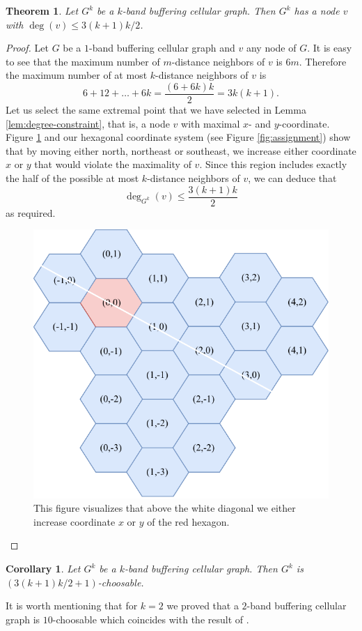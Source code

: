 \documentclass[a4paper, 12pt]{article}
\newtheorem{theo}[lem]{Theorem}
\newtheorem{corollary}[lem]{Corollary}
\begin{document}
\begin{theo}\label{theo:extremal-degree} Let $G^k$ be a $k$-band buffering cellular graph. Then $G^k$ has a node $v$ with $\deg(v) \leqslant 3(k+1)k/2$.
\end{theo}
\begin{proof} Let $G$ be a $1$-band buffering cellular graph and $v$ any node of $G$. It is easy to see that the maximum number of $m$-distance neighbors of $v$ is $6m$. Therefore the maximum number of at most $k$-distance neighbors of $v$ is 
$$6+12+\ldots+6k=\frac{(6 + 6k)k}{2} = 3k(k+1).$$
Let us select the same extremal point that we have selected in Lemma \ref{lem:degree-constraint}, that is, a node $v$ with maximal $x$- and $y$-coordinate. Figure \ref{fig:extremal-proof} and our hexagonal coordinate system (see Figure \ref{fig:assignment}) show that by moving either north, northeast or southeast, we increase either coordinate $x$ or $y$ that would violate the maximality of $v$. Since this region includes exactly the half of the possible at most $k$-distance neighbors of $v$, we can deduce that
$$\deg_{G^k}(v) \leqslant \frac{3(k+1)k}{2}$$ 
as required.
\begin{figure}[!h]
\centering
\includegraphics[scale=1]{figures/proof-k-band-buffering.pdf}
\caption{This figure visualizes that above the white diagonal we either increase coordinate $x$ or $y$ of the red hexagon.}\label{fig:extremal-proof}
\end{figure}
\end{proof}
\begin{corollary}\label{cor:main-result} Let $G^k$ be a $k$-band buffering cellular graph. Then $G^k$ is $(3(k+1)k/2+1)$-choosable.
\end{corollary}
It is worth mentioning that for $k=2$ we proved that a $2$-band buffering cellular graph is $10$-choosable which coincides with the result of \cite{7248845}. 
\end{document}
